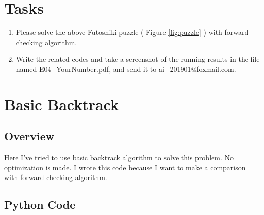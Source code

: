\documentclass[a4paper, 11pt]{article}
\begin{document}
\section{Tasks}


\begin{enumerate}
\item Please solve the above Futoshiki puzzle ( Figure \ref{fig:puzzle} ) with forward checking algorithm.
\item Write the related codes and take a screenshot of the running results in the file named \textsf{E04\_YourNumber.pdf}, and send it to \textsf{ai\_201901@foxmail.com}.

\end{enumerate}
\section{Basic Backtrack}
\subsection{Overview}
Here I've tried to use basic backtrack algorithm to solve this problem. No optimization is made. I wrote this code because I want to make a comparison with forward checking algorithm.

\subsection{Python Code}
\end{document}

